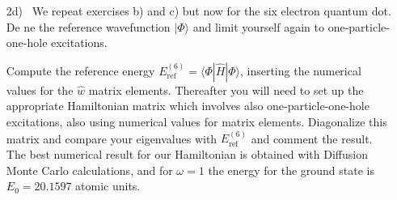\documentclass[a4paper]{article}
\begin{document}
\begin{exframe}
\begin{itemize}
  \item[2d)] We repeat exercises b) and c) but now for the six electron quantum dot. De ne the reference wavefunction $|\Phi\rangle$ and limit yourself again to one-particle-one-hole excitations.

  Compute the reference energy $E_\text{ref}^{(6)}=\langle \Phi|\hat{H}|\Phi\rangle$, inserting the numerical values for the $\hat w$ matrix elements.  Thereafter you will need to set up the appropriate Hamiltonian matrix which involves also one-particle-one-hole excitations, also using numerical values for matrix elements. Diagonalize this matrix and compare your eigenvalues with $E_\text{ref}^{(6)}$ and comment the result. The best numerical result for our Hamiltonian is obtained with Diffusion Monte Carlo calculations, and for $\omega=1$ the energy for the ground state is $E_0=20.1597$ atomic units.
\end{itemize}
\end{exframe}
\end{document}
